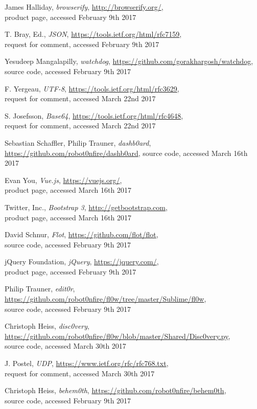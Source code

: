 \documentclass[conference]{IEEEtran}
\begin{document}
\begin{thebibliography}{1}
James Halliday, \emph{browserify}, \url{http://browserify.org/},\\ product page,
accessed February 9th 2017

T. Bray, Ed., \emph{JSON}, \url{https://tools.ietf.org/html/rfc7159},\\ request for comment,
accessed February 9th 2017

Yesudeep Mangalapilly, \emph{watchdog}, \url{https://github.com/gorakhargosh/watchdog}, source code,
accessed February 9th 2017

F. Yergeau, \emph{UTF-8}, \url{https://tools.ietf.org/html/rfc3629},\\ request for comment,
accessed March 22nd 2017

S. Josefsson, \emph{Base64}, \url{https://tools.ietf.org/html/rfc4648}, \\ request for comment,
accessed March 22nd 2017

Sebastian Schaffler, Philip Trauner, \emph{dashb0ard}, \url{https://github.com/robot0nfire/dashb0ard}, source code,
accessed March 16th 2017

Evan You, \emph{Vue.js}, \url{https://vuejs.org/},\\ product page,
accessed March 16th 2017

Twitter, Inc., \emph{Bootstrap 3}, \url{http://getbootstrap.com},\\ product page,
accessed March 16th 2017

David Schnur, \emph{Flot}, \url{https://github.com/flot/flot},\\ source code,
accessed February 9th 2017

jQuery Foundation, \emph{jQuery}, \url{https://jquery.com/},\\ product page,
accessed February 9th 2017

Philip Trauner, \emph{edit0r}, \url{https://github.com/robot0nfire/fl0w/tree/master/Sublime/fl0w},\\ source code, accessed February 9th 2017

Christoph Heiss, \emph{disc0very}, \url{https://github.com/robot0nfire/fl0w/blob/master/Shared/Disc0very.py},\\ source code, accessed March 30th 2017

J. Postel, \emph{UDP}, \url{https://www.ietf.org/rfc/rfc768.txt},\\ request for comment, accessed March 30th 2017

Christoph Heiss, \emph{behem0th}, \url{https://github.com/robot0nfire/behem0th},\\ source code,
accessed February 9th 2017

\end{thebibliography}
\end{document}
